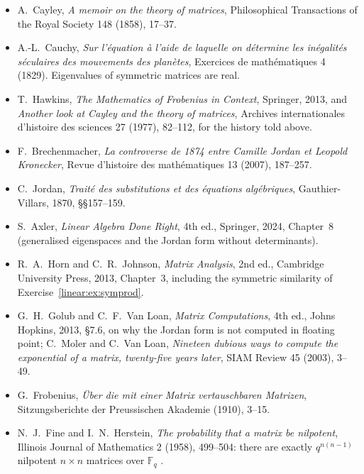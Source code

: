 \begin{itemize}
\item A.~Cayley, \emph{A memoir on the theory of matrices}, Philosophical Transactions of the Royal Society 148 (1858),
17--37.
\item A.-L.~Cauchy, \emph{Sur l'\'equation \`a l'aide de laquelle on d\'etermine les in\'egalit\'es s\'eculaires des
mouvements des plan\`etes}, Exercices de math\'ematiques 4 (1829). Eigenvalues of symmetric matrices are real.
\item T.~Hawkins, \emph{The Mathematics of Frobenius in Context}, Springer, 2013, and \emph{Another look at Cayley and the
theory of matrices}, Archives internationales d'histoire des sciences 27 (1977), 82--112, for the history told above.
\item F.~Brechenmacher, \emph{La controverse de 1874 entre Camille Jordan et Leopold Kronecker}, Revue d'histoire des
math\'ematiques 13 (2007), 187--257.
\item C.~Jordan, \emph{Trait\'e des substitutions et des \'equations alg\'ebriques}, Gauthier-Villars, 1870, \S\S157--159.
\item S.~Axler, \emph{Linear Algebra Done Right}, 4th ed., Springer, 2024, Chapter~8 (generalised eigenspaces and the
Jordan form without determinants).
\item R.~A.~Horn and C.~R.~Johnson, \emph{Matrix Analysis}, 2nd ed., Cambridge University Press, 2013, Chapter~3, including
the symmetric similarity of Exercise~\ref{linear:ex:symprod}.
\item G.~H.~Golub and C.~F.~Van Loan, \emph{Matrix Computations}, 4th ed., Johns Hopkins, 2013, \S7.6, on why the Jordan
form is not computed in floating point; C.~Moler and C.~Van Loan, \emph{Nineteen dubious ways to compute the exponential of a
matrix, twenty-five years later}, SIAM Review 45 (2003), 3--49.
\item G.~Frobenius, \emph{\"Uber die mit einer Matrix vertauschbaren Matrizen}, Sitzungsberichte der Preussischen Akademie
(1910), 3--15.
\item N.~J.~Fine and I.~N.~Herstein, \emph{The probability that a matrix be nilpotent}, Illinois Journal of Mathematics 2
(1958), 499--504: there are exactly $q^{n(n-1)}$ nilpotent $n\times n$ matrices over $\mathbb F_q$ .
\end{itemize}

